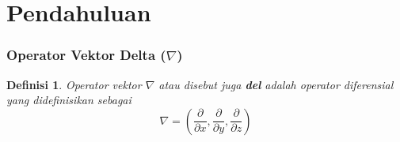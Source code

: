 \documentclass[10pt]{beamer}
\newtheorem{definisi}{Definisi}
\begin{document}
\section{Pendahuluan}

\begin{frame}
    \frametitle{Operator Vektor Delta ($\nabla$)}
    \begin{definisi}
        Operator vektor $\nabla$ atau disebut juga \textbf{del} adalah operator diferensial yang didefinisikan sebagai
        \begin{equation}
            \nabla = \left(\frac{\partial}{\partial x}, \frac{\partial}{\partial y}, \frac{\partial}{\partial z}\right)
        \end{equation}
    \end{definisi}
\end{frame}
\end{document}

